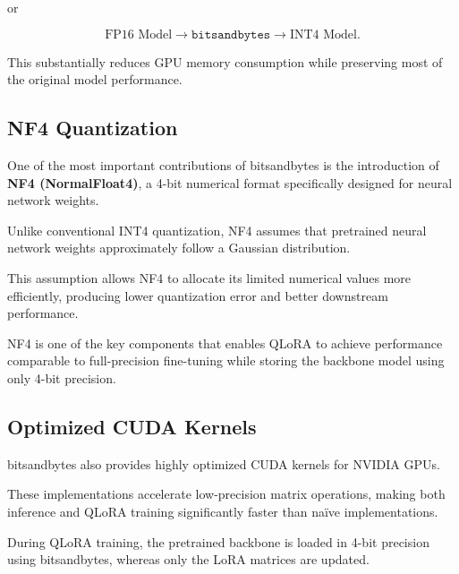 or

\[
\text{FP16 Model}
\longrightarrow
\texttt{bitsandbytes}
\longrightarrow
\text{INT4 Model}.
\]

This substantially reduces GPU memory consumption while preserving most of the original model performance.
\subsection*{NF4 Quantization}

One of the most important contributions of bitsandbytes is the introduction of \textbf{NF4 (NormalFloat4)}, a 4-bit numerical format specifically designed for neural network weights.

Unlike conventional INT4 quantization, NF4 assumes that pretrained neural network weights approximately follow a Gaussian distribution.

This assumption allows NF4 to allocate its limited numerical values more efficiently, producing lower quantization error and better downstream performance.

NF4 is one of the key components that enables QLoRA to achieve performance comparable to full-precision fine-tuning while storing the backbone model using only 4-bit precision.
\subsection*{Optimized CUDA Kernels}

bitsandbytes also provides highly optimized CUDA kernels for NVIDIA GPUs.

These implementations accelerate low-precision matrix operations, making both inference and QLoRA training significantly faster than naïve implementations.


During QLoRA training, the pretrained backbone is loaded in 4-bit precision using bitsandbytes, whereas only the LoRA matrices are updated.

